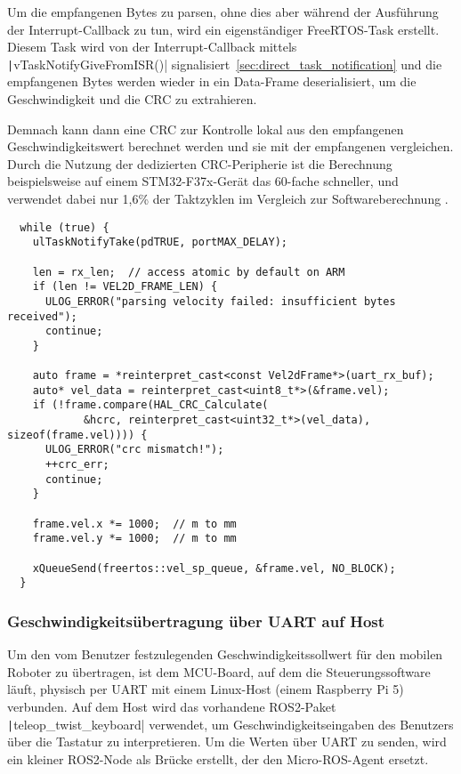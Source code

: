 Um die empfangenen Bytes zu parsen, ohne dies aber während der Ausführung der
Interrupt-Callback zu tun, wird ein eigenständiger FreeRTOS-Task erstellt.
Diesem Task wird von der Interrupt-Callback mittels
\texttt|vTaskNotifyGiveFromISR()|
signalisiert~\ref{sec:direct_task_notification} und die empfangenen Bytes werden
wieder in ein Data-Frame deserialisiert, um die Geschwindigkeit und die CRC zu
extrahieren.

Demnach kann dann eine CRC zur Kontrolle lokal aus den empfangenen
Geschwindigkeitswert berechnet werden und sie mit der empfangenen vergleichen.
Durch die Nutzung der dedizierten CRC-Peripherie ist die Berechnung
beispielsweise auf einem STM32-F37x-Gerät das 60-fache schneller, und verwendet
dabei nur 1,6\% der Taktzyklen im Vergleich zur Softwareberechnung \cite[S.
9]{AN4187}.

\begin{code}
\begin{verbatim}
  while (true) {
    ulTaskNotifyTake(pdTRUE, portMAX_DELAY);

    len = rx_len;  // access atomic by default on ARM
    if (len != VEL2D_FRAME_LEN) {
      ULOG_ERROR("parsing velocity failed: insufficient bytes received");
      continue;
    }

    auto frame = *reinterpret_cast<const Vel2dFrame*>(uart_rx_buf);
    auto* vel_data = reinterpret_cast<uint8_t*>(&frame.vel);
    if (!frame.compare(HAL_CRC_Calculate(
            &hcrc, reinterpret_cast<uint32_t*>(vel_data), sizeof(frame.vel)))) {
      ULOG_ERROR("crc mismatch!");
      ++crc_err;
      continue;
    }

    frame.vel.x *= 1000;  // m to mm
    frame.vel.y *= 1000;  // m to mm

    xQueueSend(freertos::vel_sp_queue, &frame.vel, NO_BLOCK);
  }
\end{verbatim}
\end{code}

\subsubsection{Geschwindigkeitsübertragung über UART auf Host}

Um den vom Benutzer festzulegenden Geschwindigkeitssollwert für den mobilen
Roboter zu übertragen, ist dem MCU-Board, auf dem die Steuerungssoftware läuft,
physisch per UART mit einem Linux-Host (einem Raspberry Pi 5) verbunden. Auf dem
Host wird das vorhandene ROS2-Paket \texttt|teleop_twist_keyboard|
verwendet, um Geschwindigkeitseingaben des Benutzers über die Tastatur zu
interpretieren. Um die Werten über UART zu senden, wird ein kleiner ROS2-Node
als Brücke erstellt, der den Micro-ROS-Agent ersetzt.

